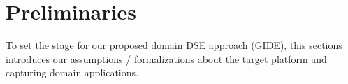 \vspace{-8pt}
\section{Preliminaries}
\label{sec:Pre}

To set the stage for our proposed domain DSE approach (GIDE), this sections introduces our assumptions / formalizations about the target platform and capturing domain applications.



